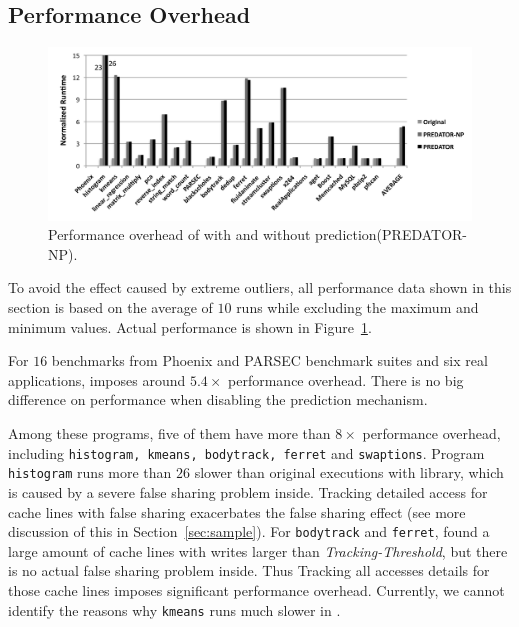 \subsection{Performance Overhead}
\label{sec:perfoverhead}

\begin{figure}[ht]
\begin{center}
\includegraphics[width=6.5in]{fig/perf}
\end{center}
\caption{
Performance overhead of \Predator{} with and without prediction(PREDATOR-NP).
\label{fig:perf}}
\end{figure}

To avoid the effect caused by extreme outliers, all performance data shown in this section
is based on the average of $10$ runs while excluding the maximum and minimum values. Actual performance is shown in Figure~\ref{fig:perf}. 

For $16$ benchmarks from Phoenix and PARSEC benchmark suites and six real applications,  \Predator{} imposes around $5.4\times$ performance overhead. There is no big difference on performance when disabling the prediction mechanism. 
 
Among these programs, five of them have more than $8\times$ performance overhead, including \texttt{histogram, kmeans, bodytrack, ferret} and \texttt{swaptions}. 
Program \texttt{histogram} runs more than $26$ slower than original executions with \pthreads{} library, which is caused by a severe false sharing problem inside. Tracking detailed access for cache lines with false sharing exacerbates the false sharing effect (see more discussion of this in Section~\ref{sec:sample}).  For \texttt{bodytrack} and \texttt{ferret}, \Predator{} found a large amount of cache lines with writes larger than {\it Tracking-Threshold}, but there is no actual false sharing problem inside. Thus Tracking all accesses details for those cache lines imposes significant performance overhead. Currently, we cannot identify the reasons why \texttt{kmeans} runs much slower in \Predator{}.
   

